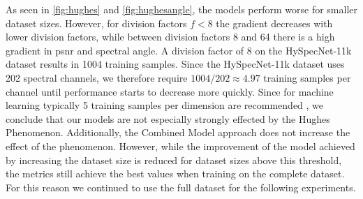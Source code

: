 As seen in \autoref{fig:hughes} and \autoref{fig:hughesangle}, the models perform worse for smaller dataset sizes. However, for division factors $f < 8$ the gradient decreases with lower division factors, while between division factors 8 and 64 there is a high gradient in \ac{psnr} and spectral angle. A division factor of 8 on the HySpecNet-11k dataset results in 1004 training samples. Since the HySpecNet-11k dataset uses 202 spectral channels, we therefore require $1004/202 \approx 4.97$ training samples per channel until performance starts to decrease more quickly. Since for machine learning typically 5 training samples per dimension are recommended \citep{theodoridis_pattern_2009}, we conclude that our models are not especially strongly effected by the Hughes Phenomenon. Additionally, the Combined Model approach does not increase the effect of the phenomenon. However, while the improvement of the model achieved by increasing the dataset size is reduced for dataset sizes above this threshold, the metrics still achieve the best values when training on the complete dataset. For this reason we continued to use the full dataset for the following experiments.
